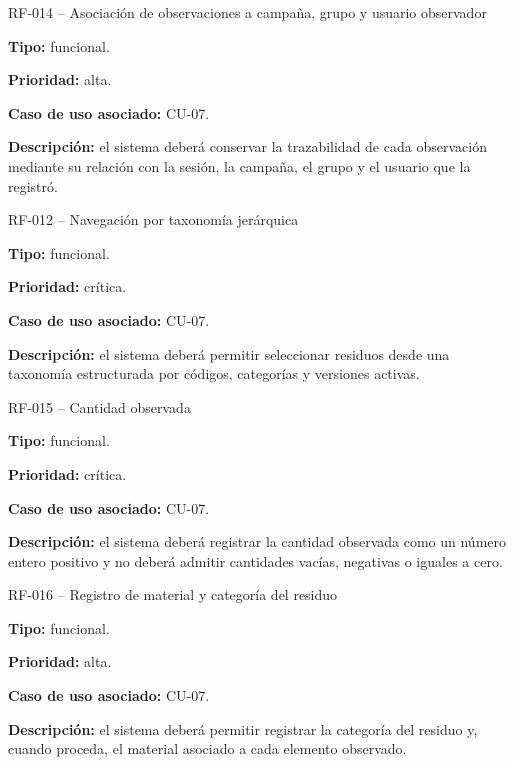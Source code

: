 \begin{requisitocard}{RF-014 -- Asociación de observaciones a campaña, grupo y usuario observador}

\textbf{Tipo:} funcional.

\textbf{Prioridad:} alta.

\textbf{Caso de uso asociado:} CU-07.

\textbf{Descripción:} el sistema deberá conservar la trazabilidad de cada
observación mediante su relación con la sesión, la campaña, el grupo y el usuario
que la registró.

\end{requisitocard}

\begin{requisitocard}{RF-012 -- Navegación por taxonomía jerárquica}

\textbf{Tipo:} funcional.

\textbf{Prioridad:} crítica.

\textbf{Caso de uso asociado:} CU-07.

\textbf{Descripción:} el sistema deberá permitir seleccionar residuos desde una
taxonomía estructurada por códigos, categorías y versiones activas.

\end{requisitocard}

\begin{requisitocard}{RF-015 -- Cantidad observada}

\textbf{Tipo:} funcional.

\textbf{Prioridad:} crítica.

\textbf{Caso de uso asociado:} CU-07.

\textbf{Descripción:} el sistema deberá registrar la cantidad observada como un
número entero positivo y no deberá admitir cantidades vacías, negativas o iguales
a cero.

\end{requisitocard}

\begin{requisitocard}{RF-016 -- Registro de material y categoría del residuo}

\textbf{Tipo:} funcional.

\textbf{Prioridad:} alta.

\textbf{Caso de uso asociado:} CU-07.

\textbf{Descripción:} el sistema deberá permitir registrar la categoría del
residuo y, cuando proceda, el material asociado a cada elemento observado.

\end{requisitocard}

